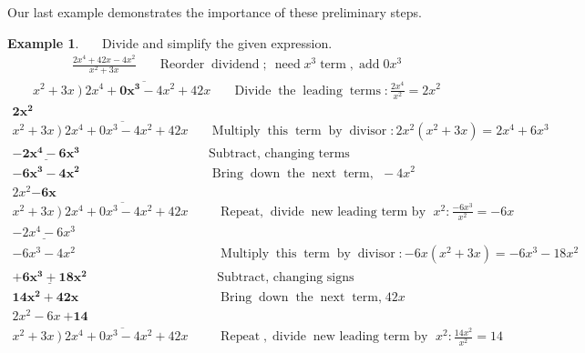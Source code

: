 \documentclass[12pt]{book}
\theoremstyle{definition}
\newtheorem{example}{Example}
\newcommand{\tmmathbf}[1]{\ensuremath{\boldsymbol{#1}}}
\newcommand{\tmop}[1]{\ensuremath{\operatorname{#1}}}
\begin{document}
Our last example demonstrates the importance of these preliminary steps.
\begin{example}~~~Divide and simplify the given expression.
  \begin{eqnarray*}
    \frac{2 x^4 + 42x - 4 x^2}{x^2 + 3x} &  & \tmop{Reorder} \tmop{dividend};~
    \tmop{need} x^3 \tmop{term}, \tmop{add} 0 x^3
	\end{eqnarray*}
  \begin{eqnarray*}
    x^2 + 3x~ \overline{)~2 x^4 + \tmmathbf{0 x^3} - 4 x^2 + 42x} &  & \tmop{Divide} \tmop{the}
    \tmop{leading} \tmop{terms} : \frac{2 x^4}{x^2} = 2 x^2
	\end{eqnarray*}
	\begin{eqnarray*}
    \tmmathbf{2 x^2}~~~~~~~~~~~~~~~~~~~~~~~~  &  & \\
    x^2 + 3x~ \overline{)~2 x^4 + 0 x^3 - 4 x^2 + 42x} &  & \tmop{Multiply}
    \tmop{this} \tmop{term} \tmop{by} \tmop{divisor} : 2 x^2 (x^2 + 3x) = 2 x^4 +
    6 x^3\\
    \underline{\tmmathbf{- 2 x^4 - 6 x^3} }~~~~~~~~~~~~~~~~ &  & \tmop{Subtract,~changing~terms}\\
    \tmmathbf{- 6 x^3 - 4 x^2}~~~~~~~  &  & \tmop{Bring} \tmop{down} \tmop{the}
    \tmop{next} \tmop{term,~}-4x^2
   \end{eqnarray*}
  \begin{eqnarray*}
	  2 x^2 \tmmathbf{- 6 x}~~~~~~~~~~~~~~~~~~~~~  &  & \\
    x^2 + 3x~ \overline{)~2 x^4 + 0 x^3 - 4 x^2 + 42x}~~~ &  & \tmop{Repeat,}
    \tmop{divide} \tmop{new~leading~term~by~}x^2 : \frac{- 6 x^3}{x^2} = - 6 x\\
    \underline{- 2 x^4 - 6 x^3 }~~~~~~~~~~~~~~~~~~~ &  & \\
    - 6 x^3 - 4 x^2~~~~~~~~~~~ &  & \tmop{Multiply} \tmop{this} \tmop{term} \tmop{by}
    \tmop{divisor} : - 6 x (x^2 + 3x) = - 6 x^3 - 18 x^2\\
    \underline{\tmmathbf{+ 6 x^3 + 18 x^2} }~~~~~~~~~  &  & \tmop{Subtract,~changing~signs}\\
    \tmmathbf{14 x^2 + 42x} &  & \tmop{Bring} \tmop{down} \tmop{the} \tmop{next}
    \tmop{term,} 42x
		\end{eqnarray*}
  \begin{eqnarray*}
    2 x^2 - 6 x ~\tmmathbf{+14}~~~~~~~~~~~~~~  &  & \\
    x^2 + 3x~ \overline{)~2 x^4 + 0 x^3 - 4 x^2 + 42x}~~~ &  & \tmop{Repeat},
    \tmop{divide} \tmop{new~leading~term~by~} x^2: \frac{14 x^2}{x^2} = 14\\

\end{eqnarray*}
\end{example}
\end{document}
